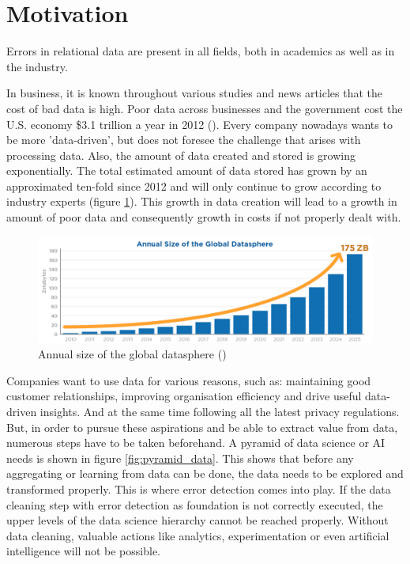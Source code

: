 \section{Motivation}
\label{sec:motivation}
Errors in relational data are present in all fields, both in academics as well as in the industry. 

In business, it is known throughout various studies and news articles that the cost of bad data is high. Poor data across businesses and the government cost the U.S. economy \$3.1 trillion a year in 2012 (\cite{Ilyas2015-oh}). Every company nowadays wants to be more 'data-driven', but does not foresee the challenge that arises with processing data. Also, the amount of data created and stored is growing exponentially. The total estimated amount of data stored has grown by an approximated ten-fold since 2012 and will only continue to grow according to industry experts (figure \ref{fig:annual_data_size}). This growth in data creation will lead to a growth in amount of poor data and consequently growth in costs if not properly dealt with. 

\begin{figure}
    \centering
    \includegraphics[width=\textwidth]{thesis/Figures/AnnualDataSize.png}
    \caption{Annual size of the global datasphere (\cite{Rydning2018-mt})}
    \label{fig:annual_data_size}
\end{figure}

Companies want to use data for various reasons, such as: maintaining good customer relationships, improving organisation efficiency and drive useful data-driven insights. And at the same time following all the latest privacy regulations.  
But, in order to pursue these aspirations and be able to extract value from data, numerous steps have to be taken beforehand. A pyramid of data science or AI needs is shown in figure \ref{fig:pyramid_data}. This shows that before any aggregating or learning from data can be done, the data needs to be explored and transformed properly. This is where error detection comes into play. If the data cleaning step with error detection as foundation is not correctly executed, the upper levels of the data science hierarchy cannot be reached properly. Without data cleaning, valuable actions like analytics, experimentation or even artificial intelligence will not be possible.

